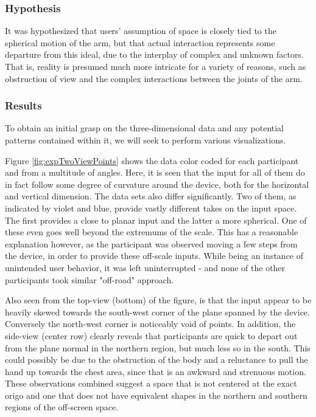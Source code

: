 
\subsubsection{Hypothesis}

It was hypothesized that users' assumption of space is closely tied to the spherical motion of the arm, but that actual interaction represents some departure from this ideal, due to the interplay of complex and unknown factors. That is, reality is presumed much more intricate for a variety of reasons,  such as obstruction of view and the complex interactions between the joints of the arm. %

\subsubsection{Results}

To obtain an initial grasp on the three-dimensional data and any potential patterns contained within it, we will seek to perform various visualizations.


Figure \ref{fig:expTwoViewPoints} shows the data color coded for each participant and from a multitude of angles. Here, it is seen that the input for all of them do in fact follow some degree of curvature around the device, both for the horizontal and vertical dimension. The data sets also differ significantly. Two of them, as indicated by violet and blue, provide vastly different takes on the input space. The first provides a close to planar input and the latter a more spherical. One of these  even goes well beyond the extremums of the scale. This has a reasonable explanation however, as the participant was observed moving a few steps from the device, in order to provide these off-scale inputs. While being an instance of unintended user behavior, it was left uninterrupted - and none of the other participants took similar "off-road" approach. 

Also seen from the top-view (bottom) of the figure, is that the input appear to be heavily skewed towards the south-west corner of the plane spanned by the device. Conversely the north-west corner is noticeably void of points. In addition, the side-view (center row) clearly reveals that participants are quick to depart out from the plane normal in the northern region, but much less so in the south. This could possibly be due to the obstruction of the body and a reluctance to pull the hand up towards the chest area, since that is an awkward and strenuous motion. These observations combined suggest a space that is not centered at the exact origo and one that does not have equivalent shapes in the northern and southern regions of the off-screen space.

